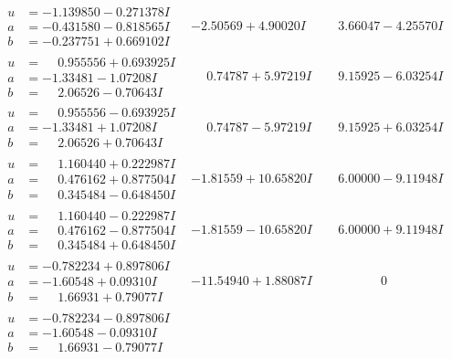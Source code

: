 \documentclass[1p]{elsarticle_modified}
\theoremstyle{definition}
\begin{document}
$$\begin{array}{c|c|c}
\begin{aligned}
u &= -1.139850 - 0.271378 I \\
a &= -0.431580 - 0.818565 I \\
b &= -0.237751 + 0.669102 I\end{aligned}
 & -2.50569 + 4.90020 I & \phantom{-}3.66047 - 4.25570 I \\ \hline\begin{aligned}
u &= \phantom{-}0.955556 + 0.693925 I \\
a &= -1.33481 - 1.07208 I \\
b &= \phantom{-}2.06526 - 0.70643 I\end{aligned}
 & \phantom{-}0.74787 + 5.97219 I & \phantom{-}9.15925 - 6.03254 I \\ \hline\begin{aligned}
u &= \phantom{-}0.955556 - 0.693925 I \\
a &= -1.33481 + 1.07208 I \\
b &= \phantom{-}2.06526 + 0.70643 I\end{aligned}
 & \phantom{-}0.74787 - 5.97219 I & \phantom{-}9.15925 + 6.03254 I \\ \hline\begin{aligned}
u &= \phantom{-}1.160440 + 0.222987 I \\
a &= \phantom{-}0.476162 + 0.877504 I \\
b &= \phantom{-}0.345484 - 0.648450 I\end{aligned}
 & -1.81559 + 10.65820 I & \phantom{-}6.00000 - 9.11948 I \\ \hline\begin{aligned}
u &= \phantom{-}1.160440 - 0.222987 I \\
a &= \phantom{-}0.476162 - 0.877504 I \\
b &= \phantom{-}0.345484 + 0.648450 I\end{aligned}
 & -1.81559 - 10.65820 I & \phantom{-}6.00000 + 9.11948 I \\ \hline\begin{aligned}
u &= -0.782234 + 0.897806 I \\
a &= -1.60548 + 0.09310 I \\
b &= \phantom{-}1.66931 + 0.79077 I\end{aligned}
 & -11.54940 + 1.88087 I & \phantom{-0.000000 } 0 \\ \hline\begin{aligned}
u &= -0.782234 - 0.897806 I \\
a &= -1.60548 - 0.09310 I \\
b &= \phantom{-}1.66931 - 0.79077 I\end{aligned}

\end{array}$$
\end{document}
